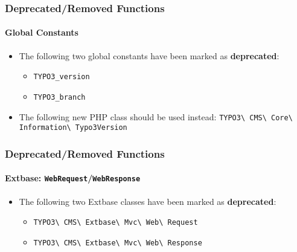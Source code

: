 
\begin{frame}[fragile]
	\frametitle{Deprecated/Removed Functions}
	\framesubtitle{Global Constants}

	\lstset{basicstyle=\smaller\ttfamily}

	\begin{itemize}
		\item The following two global constants have been marked as \textbf{deprecated}:

			\begin{itemize}
				\item \texttt{TYPO3\_version}
				\item \texttt{TYPO3\_branch}
			\end{itemize}

		\item The following new PHP class should be used instead:\newline
			\small
				\texttt{TYPO3\textbackslash
					CMS\textbackslash
					Core\textbackslash
					Information\textbackslash
					Typo3Version}\normalsize

	\end{itemize}

\end{frame}


\begin{frame}[fragile]
	\frametitle{Deprecated/Removed Functions}
	\framesubtitle{Extbase: \texttt{WebRequest}/\texttt{WebResponse}}

	\begin{itemize}
		\item The following two Extbase classes have been marked as \textbf{deprecated}:
			\begin{itemize}
				\item \texttt{TYPO3\textbackslash
					CMS\textbackslash
					Extbase\textbackslash
					Mvc\textbackslash
					Web\textbackslash
					Request}
				\item \texttt{TYPO3\textbackslash
					CMS\textbackslash
					Extbase\textbackslash
					Mvc\textbackslash
					Web\textbackslash
					Response}
			\end{itemize}

	\end{itemize}

\end{frame}

